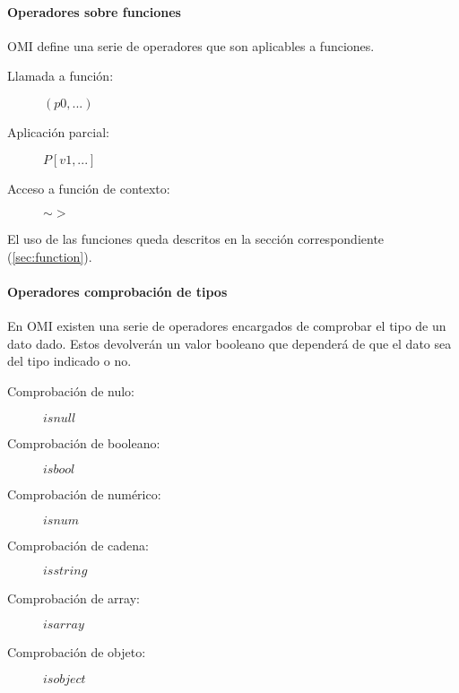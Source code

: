\paragraph{Operadores sobre funciones} \label{sec:op_func}

OMI define una serie de operadores que son aplicables a funciones. 


\begin{description}
\item [Llamada a función:] $(p0,...)$
\item [Aplicación parcial:] $P[v1,...]$
\item [Acceso a función de contexto:] $\sim>$
\end{description} 

El uso de las funciones queda descritos en la sección correspondiente (\autoref{sec:function}).



\paragraph{Operadores comprobación de tipos} \label{sec:op_typecheck}
En OMI existen una serie de operadores encargados de comprobar el tipo de un dato dado. Estos devolverán
un valor booleano que dependerá de que el dato sea del tipo indicado o no.

\begin{description}
\item [Comprobación de nulo:] $isnull$
\item [Comprobación de booleano:] $isbool$
\item [Comprobación de numérico:] $isnum$
\item [Comprobación de cadena:] $isstring$
\item [Comprobación de array:] $isarray$
\item [Comprobación de objeto:] $isobject$
\end{description} 

